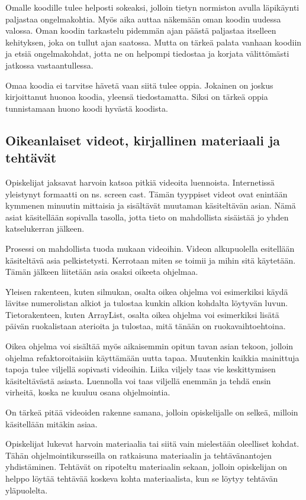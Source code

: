 Omalle koodille tulee helposti sokeaksi, jolloin tietyn normiston avulla
läpikäynti paljastaa ongelmakohtia. Myös aika auttaa näkemään oman koodin
uudessa valossa. Oman koodin tarkastelu pidemmän ajan päästä paljastaa itselleen
kehityksen, joka on tullut ajan saatossa. Mutta on tärkeä palata vanhaan koodiin
ja etsiä ongelmakohdat, jotta ne on helpompi tiedostaa ja korjata välittömästi
jatkossa vastaantullessa.

Omaa koodia ei tarvitse hävetä vaan siitä tulee oppia. Jokainen on joskus
kirjoittanut huonoa koodia, yleensä tiedostamatta. Siksi on tärkeä oppia
tunnistamaan huono koodi hyvästä koodista.

\subsection{Oikeanlaiset videot, kirjallinen materiaali ja tehtävät}

Opiskelijat jaksavat harvoin katsoa pitkiä videoita luennoista. Internetissä
yleistynyt formaatti on ns. screen cast. Tämän tyyppiset videot ovat enintään
kymmenen minuutin mittaisia ja sisältävät muutaman käsiteltävän asian. Nämä
asiat käsitellään sopivalla tasolla, jotta tieto on mahdollista sisäistää jo
yhden katselukerran jälkeen.

Prosessi on mahdollista tuoda mukaan videoihin. Videon alkupuolella esitellään
käsiteltävä asia pelkistetysti. Kerrotaan miten se toimii ja mihin sitä
käytetään. Tämän jälkeen liitetään asia osaksi oikeeta ohjelmaa.

Yleisen rakenteen, kuten silmukan, osalta oikea ohjelma voi esimerkiksi käydä
lävitse numerolistan alkiot ja tulostaa kunkin alkion kohdalta löytyvän luvun.
Tietorakenteen, kuten ArrayList, osalta oikea ohjelma voi esimerkiksi lisätä
päivän ruokalistaan aterioita ja tulostaa, mitä tänään on ruokavaihtoehtoina.

Oikea ohjelma voi sisältää myös aikaisemmin opitun tavan asian tekoon, jolloin
ohjelma refaktoroitaisiin käyttämään uutta tapaa. Muutenkin kaikkia mainittuja
tapoja tulee viljellä sopivasti videoihin. Liika viljely taas vie keskittymisen
käsiteltävästä asiasta. Luennolla voi taas viljellä enemmän ja tehdä ensin
virheitä, koska ne kuuluu osana ohjelmointia.

On tärkeä pitää videoiden rakenne samana, jolloin opiskelijalle on selkeä,
milloin käsitellään mitäkin asiaa.

Opiskelijat lukevat harvoin materiaalia tai siitä vain mielestään oleelliset
kohdat. Tähän ohjelmointikursseilla on ratkaisuna materiaalin ja tehtävänantojen
yhdistäminen. Tehtävät on ripoteltu materiaalin sekaan, jolloin opiskelijan on
helppo löytää tehtävää koskeva kohta materiaalista, kun se löytyy tehtävän
yläpuolelta.

